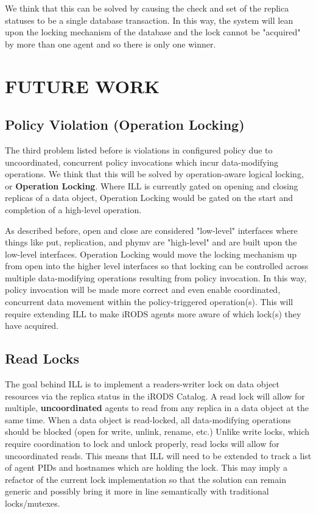 \documentclass{irodsugm}
\begin{document}
We think that this can be solved by causing the check and set of the replica statuses to be a single database transaction. In this way, the system will lean upon the locking mechanism of the database and the lock cannot be "acquired" by more than one agent and so there is only one winner.

\section*{FUTURE WORK}

\subsection*{Policy Violation (Operation Locking)}

The third problem listed before is violations in configured policy due to uncoordinated, concurrent policy invocations which incur data-modifying operations. We think that this will be solved by operation-aware logical locking, or \textbf{Operation Locking}. Where ILL is currently gated on opening and closing replicas of a data object, Operation Locking would be gated on the start and completion of a high-level operation.

As described before, open and close are considered "low-level" interfaces where things like put, replication, and phymv are "high-level" and are built upon the low-level interfaces. Operation Locking would move the locking mechanism up from open into the higher level interfaces so that locking can be controlled across multiple data-modifying operations resulting from policy invocation. In this way, policy invocation will be made more correct and even enable coordinated, concurrent data movement within the policy-triggered operation(s). This will require extending ILL to make iRODS agents more aware of which lock(s) they have acquired.

\subsection*{Read Locks}

The goal behind ILL is to implement a readers-writer lock\cite{readerswriterlock} on data object resources via the replica status in the iRODS Catalog. A read lock will allow for multiple, \textbf{uncoordinated} agents to read from any replica in a data object at the same time. When a data object is read-locked, all data-modifying operations should be blocked (open for write, unlink, rename, etc.) Unlike write locks, which require coordination to lock and unlock properly, read locks will allow for uncoordinated reads. This means that ILL will need to be extended to track a list of agent PIDs and hostnames which are holding the lock. This may imply a refactor of the current lock implementation so that the solution can remain generic and possibly bring it more in line semantically with traditional locks/mutexes.
\end{document}

